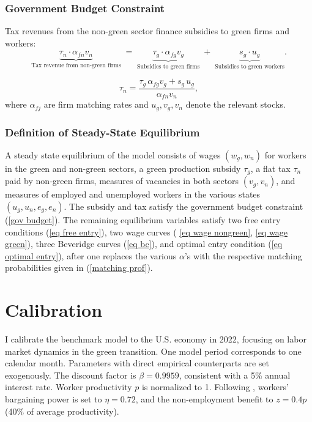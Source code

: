 \documentclass[preprint,12pt]{elsarticle}
\begin{document}
\subsubsection{Government Budget Constraint}
\label{gov}
Tax revenues from the non-green sector finance subsidies to green firms and workers:
\[
\underbrace{\tau_n \cdot \alpha_{fn} v_n}_{\text{Tax revenue from non-green firms}}
\;=\;
\underbrace{\tau_g \cdot \alpha_{fg} v_g}_{\text{Subsidies to green firms}}
\;+\;
\underbrace{s_g \cdot u_g}_{\text{Subsidies to green workers}}.
\]

\begin{equation}
\tau_n
=\frac{\tau_g\,\alpha_{fg}v_g+s_g\,u_g}{\alpha_{fn}v_n},
\label{gov budget}
\end{equation}
where $\alpha_{fj}$ are firm matching rates and $u_g,v_g,v_n$ denote the relevant stocks.

\subsubsection{Definition of Steady-State Equilibrium}
\label{definition equilibrium}
     A steady state equilibrium of the model consists of wages $(w_g, w_n)$ for workers in the green and non-green sectors, a green production subsidy $\tau_g$, a flat tax $\tau_n$ paid by non-green firms, measures of vacancies in both sectors $(v_g, v_n)$, and measures of employed and unemployed workers in the various states $(u_g, u_n, e_g, e_n)$. The subsidy and tax satisfy the government budget constraint (\ref{gov budget}). The remaining equilibrium variables satisfy two free entry conditions (\ref{eq free entry}), two wage curves ( \ref{eq wage nongreen}, \ref{eq wage green}), three Beveridge curves (\ref{eq bc}), and optimal entry condition (\ref{eq optimal entry}),  after one replaces the various $\alpha$'s with the respective matching probabilities given in (\ref{matching prof}). 

\section{Calibration}

I calibrate the benchmark model to the U.S. economy in 2022, focusing on labor market dynamics in the green transition. One model period corresponds to one calendar month. Parameters with direct empirical counterparts are set exogenously. The discount factor is $\beta=0.9959$, consistent with a 5\% annual interest rate. Worker productivity $p$ is normalized to 1. Following \citet{shimer2005cyclical}, workers’ bargaining power is set to $\eta=0.72$, and the non-employment benefit to $z=0.4p$ (40\% of average productivity).  
\end{document}
